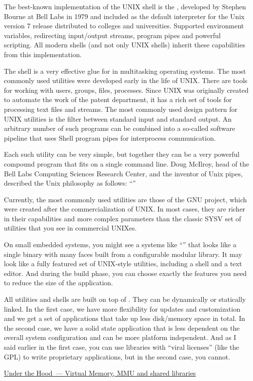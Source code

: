 The best-known implementation of the UNIX shell is the ,
developed by Stephen Bourne at Bell Labs in 1979 and included as the
default interpreter for the Unix version 7 release distributed to
colleges and universities. Supported environment variables, redirecting
input/output streams, program pipes and powerful scripting. All modern
shells (and not only UNIX shells) inherit these capabilities from this
implementation.

The shell is a very effective glue for  in multitasking
operating systems. The most commonly used utilities were developed early
in the life of UNIX. There are tools for working with users, groups, files,
processes. Since UNIX was originally created to automate the work of
the patent department, it has a rich set of tools for processing text files
and streams. The most commonly used design pattern for UNIX utilities is
the filter between standard input and standard output. An arbitrary
number of such programs can be combined into a so-called software
pipeline that uses Shell program pipes for interprocess communication.

Each such utility can be very simple, but together they can be a very
powerful compound program that fits on a single command line. Doug
McIlroy, head of the Bell Labs Computing Sciences Research Center, and
the inventor of Unix pipes, described the Unix philosophy as follows:
``''

Currently, the most commonly used utilities are those of the GNU project,
which were created after the commercialization of UNIX. In most cases,
they are richer in their capabilities and more complex parameters than
the classic SYSV set of utilities that you see in commercial UNIXes.

On small embedded systems, you might see a systems like ``''
that looks like a single binary with many faces built from a configurable
modular library. It may look like a fully featured set of UNIX-style
utilities, including a shell and a text editor. And during the build phase,
you can choose exactly the features you need to reduce the size of
the application.

All utilities and shells are built on top of .
They can be dynamically or statically linked. In the first case,
we have more flexibility for updates and customization and we get a set of
applications that take up less disk/memory space in total. In the second case,
we have a solid state application that is less dependent on the overall system
configuration and can be more platform independent. And as I said earlier
in the first case, you can use libraries with ``viral licenses'' (like the GPL)
to write proprietary applications, but in the second case, you cannot.

\href{under_the_hood/virtual_memory.md}%
{Under the Hood~--- Virtual Memory, MMU and shared libraries}
